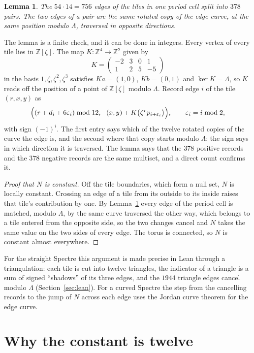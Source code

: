 \documentclass[11pt]{amsart}
\newtheorem{lemma}[theorem]{Lemma}
\theoremstyle{remark}
\newcommand{\Z}{\mathbb Z}
\begin{document}
\begin{lemma}\label{lem:pairs}
The $54\cdot14=756$ edges of the tiles in one period cell split into $378$ pairs. The two edges of a pair
are the same rotated copy of the edge curve, at the same position modulo $\Lambda$, traversed in opposite
directions.
\end{lemma}

The lemma is a finite check, and it can be done in integers. Every vertex of every tile lies in
$\Z[\zeta]$. The map $K\colon\Z^4\to\Z^2$ given by
\[
K=\begin{pmatrix}-2&3&0&1\\1&2&5&-5\end{pmatrix}
\]
in the basis $1,\zeta,\zeta^2,\zeta^3$ satisfies $Ka=(1,0)$, $Kb=(0,1)$ and $\ker K=\Lambda$, so $K$ reads off
the position of a point of $\Z[\zeta]$ modulo $\Lambda$. Record edge $i$ of the tile $(r,x,y)$ as
\[
\Bigl((r+d_i+6\varepsilon_i)\bmod 12,\ \ (x,y)+K\bigl(\zeta^rp_{i+\varepsilon_i}\bigr)\Bigr),
\qquad \varepsilon_i=i\bmod2,
\]
with sign $(-1)^i$. The first entry says which of the twelve rotated copies of the curve the edge is, and
the second where that copy starts modulo $\Lambda$; the sign says in which direction it is traversed. The
lemma says that the $378$ positive records and the $378$ negative records are the same multiset, and a
direct count confirms it.

\begin{proof}[Proof that $N$ is constant]
Off the tile boundaries, which form a null set, $N$ is locally constant. Crossing an edge of a tile from
its outside to its inside raises that tile's contribution by one. By Lemma~\ref{lem:pairs} every edge of the
period cell is matched, modulo $\Lambda$, by the same curve traversed the other way, which belongs to a tile
entered from the opposite side, so the two changes cancel and $N$ takes the same value on the two sides of
every edge. The torus is connected, so $N$ is constant almost everywhere.
\end{proof}

For the straight Spectre this argument is made precise in Lean through a triangulation: each tile is cut
into twelve triangles, the indicator of a triangle is a sum of signed ``shadows'' of its three edges, and the
$1944$ triangle edges cancel modulo $\Lambda$ (Section~\ref{sec:lean}). For a curved Spectre the step from
the cancelling records to the jump of $N$ across each edge uses the Jordan curve theorem for the edge curve.

\section{Why the constant is twelve}
\end{document}
